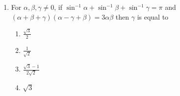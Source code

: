 \documentclass[journal]{IEEEtran}
\begin{document}
\begin{enumerate}
    \item For $\alpha, \beta, \gamma \ne 0$, if $\sin^{-1}\alpha + \sin^{-1}\beta + \sin^{-1}\gamma = \pi$
    and $(\alpha+\beta+\gamma)(\alpha-\gamma+\beta) = 3\alpha\beta$ then $\gamma$ is
    equal to

    \begin{multicols}{4}
\begin{enumerate}

        \item $\frac{\sqrt{3}}{2}$
        \item $\frac{1}{\sqrt{2}}$
        \item $\frac{\sqrt{3} - 1}{2\sqrt{2}}$
        \item $\sqrt{3}$
    \end{enumerate}
\end{multicols}
\end{enumerate}
\end{document}
